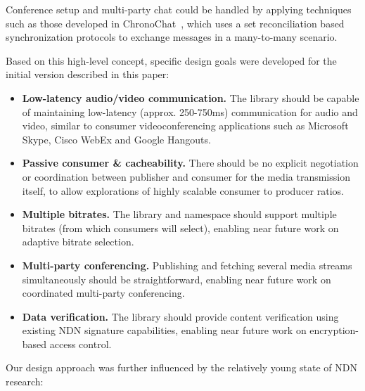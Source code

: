 \documentclass{icn/sig-alternate-2013} %
\begin{document}
Conference setup and multi-party chat could be handled by applying techniques such as those developed in ChronoChat~\cite{chronochat}, which uses a set reconciliation based synchronization protocols to exchange messages in a many-to-many scenario. 

Based on this high-level concept, specific design goals were developed for the initial version described in this paper: 


\begin{itemize}

\item \textbf{Low-latency audio/video communication.} The library should be capable of maintaining low-latency (approx. 250-750ms) communication for audio and video, similar to consumer videoconferencing applications such as Microsoft Skype, Cisco WebEx and Google Hangouts.

\item \textbf{Passive consumer \& cacheability.} There should be no explicit negotiation or coordination between publisher and consumer for the media transmission itself, to allow explorations of highly scalable consumer to producer ratios.  

\item \textbf{Multiple bitrates.} The library and namespace should support multiple bitrates (from which consumers will select), enabling near future
work on adaptive bitrate selection. 

\item \textbf{Multi-party conferencing.} Publishing and fetching several media streams simultaneously should be straightforward, enabling near future work on 
coordinated multi-party conferencing. 

\item \textbf{Data verification.} The library should provide content verification using existing NDN signature capabilities, enabling near future
work on encryption-based access control.  

\end{itemize} 


Our design approach was further influenced by the relatively young state of NDN research: 
\end{document}
